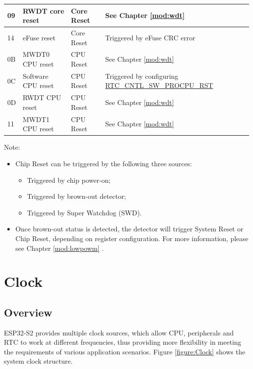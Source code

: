 \documentclass[main\_\_EN.tex]{subfiles}
\begin{document}
\begin{longtable}[c]{ |p{0.8cm}|p{3.8cm}|p{2.7cm}|p{8.7cm}| }
        \hexprefix{}09 & RWDT core reset & Core Reset & See Chapter \ref{mod:wdt} \textit{\nameref{mod:wdt}} \\
        \hline
        \hexprefix{}14 & eFuse reset & Core Reset & Triggered by eFuse CRC error \\
        \hline
        \hexprefix{}0B & MWDT0 CPU reset & CPU Reset & See Chapter \ref{mod:wdt} \textit{\nameref{mod:wdt}} \\
        \hline
        \hexprefix{}0C & Software CPU reset & CPU Reset & Triggered by configuring \hyperref[fielddesc:RTCCNTLSWPROCPURST]{RTC\_CNTL\_SW\_PROCPU\_RST}\\
        \hline
        \hexprefix{}0D & RWDT CPU reset & CPU Reset & See Chapter \ref{mod:wdt} \textit{\nameref{mod:wdt}}\\
        \hline
        \hexprefix{}11 & MWDT1 CPU reset & CPU Reset & See Chapter \ref{mod:wdt} \textit{\nameref{mod:wdt}} \\
        \hline

    \end{longtable}
    Note:
    \begin{itemize}
        \item Chip Reset can be triggered by the following three sources:
            \begin{itemize}
                \item Triggered by chip power-on;
                \item Triggered by brown-out detector;
                \item Triggered by Super Watchdog (SWD).
            \end{itemize}
        \item Once brown-out status is detected, the detector will trigger System Reset or Chip Reset, depending on register configuration. For more information, please see Chapter \ref{mod:lowpowm} \textit{}.
    \end{itemize}

\section{Clock}


\subsection{Overview}

ESP32-S2 provides multiple clock sources, which allow CPU, peripherals and RTC to work at different frequencies, thus providing more flexibility in meeting the requirements of various application scenarios. Figure \ref{figure:Clock} shows the system clock structure.
\end{document}
